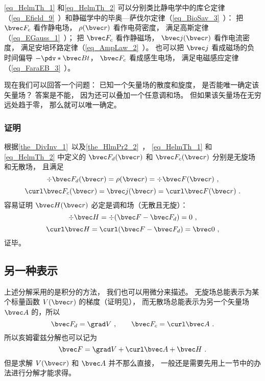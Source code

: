 \autoref{eq_HelmTh_1} 和\autoref{eq_HelmTh_2} 可以分别类比静电学中的库仑定律（\autoref{eq_Efield_9}~）和静磁学中的毕奥—萨伐尔定律（\autoref{eq_BioSav_3}~）： 把 $\bvec F_c$ 看作静电场， $\rho(\bvec r)$ 看作电荷密度， 满足高斯定律（\autoref{eq_EGauss_1}~）； 把 $\bvec F_c$ 看作静磁场， $\bvec j(\bvec r)$ 看作电流密度， 满足安培环路定律（\autoref{eq_AmpLaw_2}~）。 也可以把 $\bvec j$ 看成磁场的负时间偏导 $-\pdv*{\bvec B}{t}$， $\bvec F_c$ 看成感生电场， 满足电磁感应定律（\autoref{eq_FaraEB_3}~）。

现在我们可以回答一个问题： 已知一个矢量场的散度和旋度， 是否能唯一确定该矢量场？ 答案是不能， 因为还可以叠加一个任意调和场。 但如果该矢量场在无穷远处趋于零， 那么就可以唯一确定。

\subsubsection{证明}
根据\autoref{the_DivInv_1}~以及\autoref{the_HlmPr2_2}~， \autoref{eq_HelmTh_1} 和\autoref{eq_HelmTh_2} 中定义的 $\bvec F_{d}(\bvec r)$ 和 $\bvec F_{c}(\bvec r)$ 分别是无旋场和无散场， 且满足
\begin{equation}
\div \bvec F_d(\bvec r) = \rho(\bvec r) = \div \bvec F(\bvec r)~,
\end{equation}
\begin{equation}
\curl \bvec F_c(\bvec r) = \bvec j(\bvec r) = \curl \bvec F(\bvec r)~.
\end{equation}
容易证明 $\bvec H(\bvec r)$ 必定是调和场（无散且无旋）：
\begin{equation}
\div \bvec H = \div (\bvec F - \bvec F_d) = 0~,
\end{equation}
\begin{equation}
\curl \bvec H = \curl (\bvec F - \bvec F_d) = \bvec 0~,
\end{equation}
证毕。

\subsection{另一种表示}
上述分解采用的是积分的方法， 我们也可以用微分来描述。 无旋场总能表示为某个标量函数 $V(\bvec r)$ 的梯度（证明见）， 而无散场总能表示为另一个矢量场 $\bvec A$ 的，所以
\begin{equation}
\bvec F_{d} = \grad V~,\qquad \bvec F_{c} = \curl \bvec A~.
\end{equation}
所以亥姆霍兹分解也可以记为
\begin{equation}
\bvec F = \grad V + \curl \bvec A + \bvec H~.
\end{equation}
但是求解 $V(\bvec r)$ 和 $\bvec A$ 并不那么直接， 一般还是需要先用上一节中的办法进行分解才能求得。

